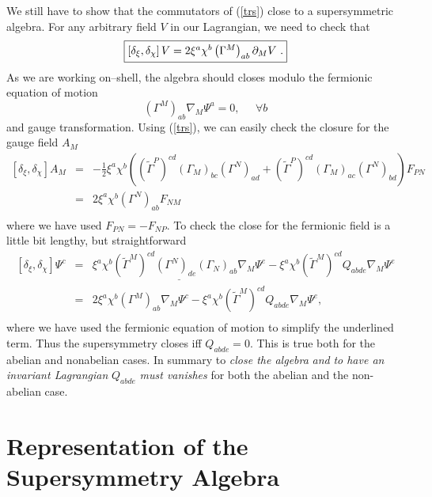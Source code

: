 \documentclass[a4paper,12pt]{book}
\begin{document}
We still have to show that the commutators of (\ref{trs}) close to a
supersymmetric algebra. For any arbitrary field $V$ in our Lagrangian, we
need to check that 
\begin{equation}
\fbox{$\left[ \delta _{\xi },\delta _{\chi }\right] V=2\xi ^{a}\chi
^{b}\left( \Gamma ^{M}\right) _{ab}\partial _{M}V$\ .}  \label{salg}
\end{equation}
As we are working on--shell, the algebra should closes modulo the fermionic
equation of motion 
\begin{equation}
\left( \Gamma ^{M}\right) _{ab}\nabla _{M}\Psi ^{a}=0,\;\;\;\;\;\forall b
\end{equation}
and gauge transformation. Using (\ref{trs}), we can easily check the closure
for the gauge field $A_{M}$%
\begin{eqnarray}
\left[ \delta _{\xi },\delta _{\chi }\right] A_{M} &=&-\frac{1}{2}\xi
^{a}\chi ^{b}\left( \left( \tilde{\Gamma}^{P}\right) ^{cd}\left( \Gamma
_{M}\right) _{bc}\left( \Gamma ^{N}\right) _{ad}+\left( \tilde{\Gamma}%
^{P}\right) ^{cd}\left( \Gamma _{M}\right) _{ac}\left( \Gamma ^{N}\right)
_{bd}\right) F_{PN}  \nonumber \\
&=&2\xi ^{a}\chi ^{b}\left( \Gamma ^{N}\right) _{ab}F_{NM}  \nonumber \\
&&
\end{eqnarray}
where we have used $F_{PN}=-F_{NP}$. To check the close for the fermionic
field is a little bit lengthy, but straightforward 
\begin{eqnarray}
\left[ \delta _{\xi },\delta _{\chi }\right] \Psi ^{c} &=&\underline{\xi
^{a}\chi ^{b}\left( \tilde{\Gamma}^{M}\right) ^{cd}\left( \Gamma ^{N}\right)
_{de}\left( \Gamma _{N}\right) _{ab}\nabla _{M}\Psi ^{e}}-\xi ^{a}\chi
^{b}\left( \tilde{\Gamma}^{M}\right) ^{cd}Q_{abde}\nabla _{M}\Psi ^{e} 
\nonumber \\
&=&2\xi ^{a}\chi ^{b}\left( \Gamma ^{M}\right) _{ab}\nabla _{M}\Psi ^{c}-\xi
^{a}\chi ^{b}\left( \tilde{\Gamma}^{M}\right) ^{cd}Q_{abde}\nabla _{M}\Psi
^{e},  \nonumber \\
&&
\end{eqnarray}
where we have used the fermionic equation of motion to simplify the
underlined term. Thus the supersymmetry closes iff $Q_{abde}=0.$ This is
true both for the abelian and nonabelian cases. In summary to \emph{close
the algebra} \emph{and} \emph{to have an invariant Lagrangian} $Q_{abde}$ 
\emph{must vanishes }for both the abelian and the non-abelian case.

\section{Representation of the Supersymmetry Algebra}
\end{document}
